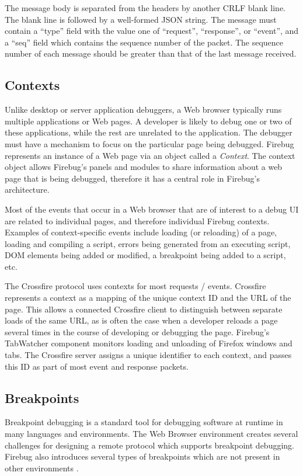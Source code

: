The message body is separated from the headers by another CRLF blank line.
The blank line is followed by a well-formed JSON string. The message must contain a ``type'' field with the value one of
``request'', ``response'', or ``event'', and a ``seq'' field which contains the
sequence number of the packet. The sequence number of each message should
be greater than that of the last message received.

\subsection {Contexts}
Unlike desktop or server application debuggers, a Web browser typically runs
multiple applications or Web pages. A developer is likely to debug one or two of these applications,
while the rest are unrelated to the application. The debugger must
have a mechanism to focus on the particular page being debugged.
Firebug represents an instance of a Web page via an object called a
\textit{Context}. The context object allows Firebug's panels and modules to
share information about a web page that is being debugged, therefore it has a
central role in Firebug's architecture.

Most of the events that occur in a Web browser that are of interest to a debug
UI are related to individual pages, and therefore individual Firebug contexts.
Examples of context-specific events include loading (or reloading) of a page,
loading and compiling a script, errors being generated from an executing script,
DOM elements being added or modified, a breakpoint being added to a script, etc.

The Crossfire protocol uses contexts for
most requests / events. Crossfire represents a context as a mapping of the
unique context ID and the URL of the page. This allows a connected Crossfire
client to distinguish between separate loads of the same URL, as is often the
case when a developer reloads a page several times in the course of developing
or debugging the page.
Firebug's TabWatcher component monitors loading and unloading of Firefox windows
and tabs.  The Crossfire server assigns a unique identifier to each
context, and passes this ID as part of most event and response packets.

\subsection {Breakpoints}
Breakpoint debugging is a standard tool for debugging software at runtime in
many languages and environments. The Web Browser environment creates several
challenges for designing a remote protocol which supports breakpoint debugging.
Firebug also introduces several types of breakpoints which are not present in
other environments \cite{jjb-www2010}.

